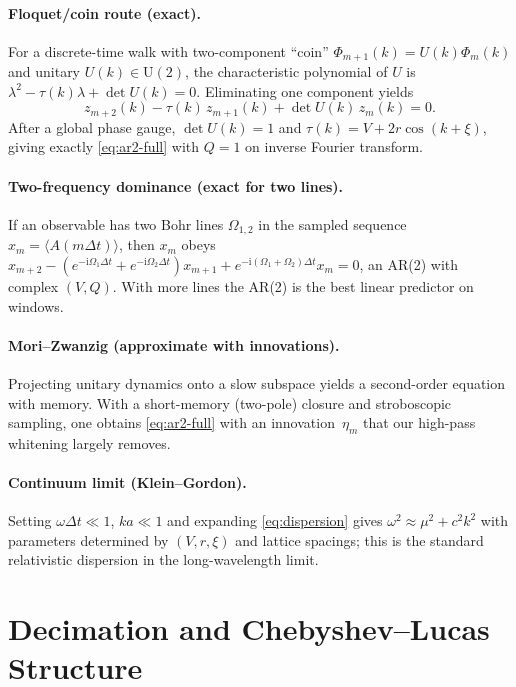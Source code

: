 \documentclass[11pt]{article}
\newcommand{\im}{\mathrm{i}}
\begin{document}
\paragraph{Floquet/coin route (exact).}
For a discrete-time walk with two-component ``coin'' $\Phi_{m+1}(k)=U(k)\Phi_m(k)$ and unitary
$U(k)\in\mathrm{U}(2)$, the characteristic polynomial of $U$ is
$\lambda^2 - \tau(k)\lambda + \det U(k)=0$. Eliminating one component yields
\begin{equation}
z_{m+2}(k)-\tau(k)\,z_{m+1}(k)+\det U(k)\,z_m(k)=0.
\end{equation}
After a global phase gauge, $\det U(k)=1$ and $\tau(k)=V+2r\cos(k+\xi)$, giving exactly
\eqref{eq:ar2-full} with $Q=1$ on inverse Fourier transform.

\paragraph{Two-frequency dominance (exact for two lines).}
If an observable has two Bohr lines $\Omega_{1,2}$ in the sampled sequence
$x_m=\langle A(m\Delta t)\rangle$, then $x_m$ obeys
$x_{m+2}- (e^{-\im\Omega_1\Delta t}+e^{-\im\Omega_2\Delta t})x_{m+1} + e^{-\im(\Omega_1+\Omega_2)\Delta t}x_m=0$,
an AR(2) with complex $(V,Q)$. With more lines the AR(2) is the best linear predictor on windows.

\paragraph{Mori--Zwanzig (approximate with innovations).}
Projecting unitary dynamics onto a slow subspace yields a second-order equation with memory. With
a short-memory (two-pole) closure and stroboscopic sampling, one obtains \eqref{eq:ar2-full} with
an innovation~$\eta_m$ that our high-pass whitening largely removes.

\paragraph{Continuum limit (Klein--Gordon).}
Setting $\omega\Delta t\ll1$, $ka\ll1$ and expanding \eqref{eq:dispersion} gives
$\omega^2 \approx \mu^2 + c^2k^2$ with parameters determined by $(V,r,\xi)$ and lattice spacings;
this is the standard relativistic dispersion in the long-wavelength limit.

\section{Decimation and Chebyshev--Lucas Structure}
\label{sec:decimation}
\end{document}
